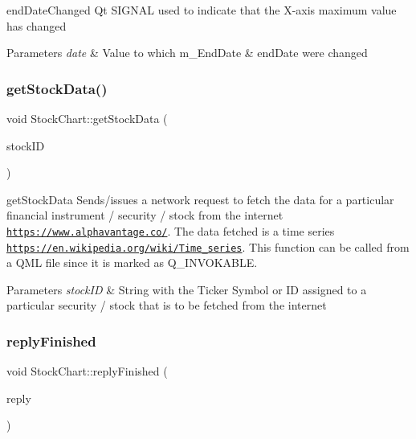 end\+Date\+Changed Qt S\+I\+G\+N\+AL used to indicate that the X-\/axis maximum value has changed 


\begin{DoxyParams}{Parameters}
{\em date} & Value to which m\+\_\+\+End\+Date \& end\+Date were changed \\
\hline
\end{DoxyParams}
\mbox{\label{class_stock_chart_ab108485d635146b2dc9bb1192c4371ec}} 
\subsubsection{\texorpdfstring{get\+Stock\+Data()}{getStockData()}}
{\footnotesize\ttfamily void Stock\+Chart\+::get\+Stock\+Data (\begin{DoxyParamCaption}\item[{const Q\+String \&}]{stock\+ID }\end{DoxyParamCaption})}



get\+Stock\+Data Sends/issues a network request to fetch the data for a particular financial instrument / security / stock from the internet \href{https://www.alphavantage.co/}{\tt https\+://www.\+alphavantage.\+co/}. The data fetched is a time series \href{https://en.wikipedia.org/wiki/Time_series}{\tt https\+://en.\+wikipedia.\+org/wiki/\+Time\+\_\+series}. This function can be called from a Q\+ML file since it is marked as Q\+\_\+\+I\+N\+V\+O\+K\+A\+B\+LE. 


\begin{DoxyParams}{Parameters}
{\em stock\+ID} & String with the Ticker Symbol or ID assigned to a particular security / stock that is to be fetched from the internet \\
\hline
\end{DoxyParams}
\mbox{\label{class_stock_chart_a2521c5991cca0803f5890e23d90672da}} 
\subsubsection{\texorpdfstring{reply\+Finished}{replyFinished}}
{\footnotesize\ttfamily void Stock\+Chart\+::reply\+Finished (\begin{DoxyParamCaption}\item[{Q\+Network\+Reply $\ast$}]{reply }\end{DoxyParamCaption})\hspace{0.3cm}{\ttfamily [slot]}}



